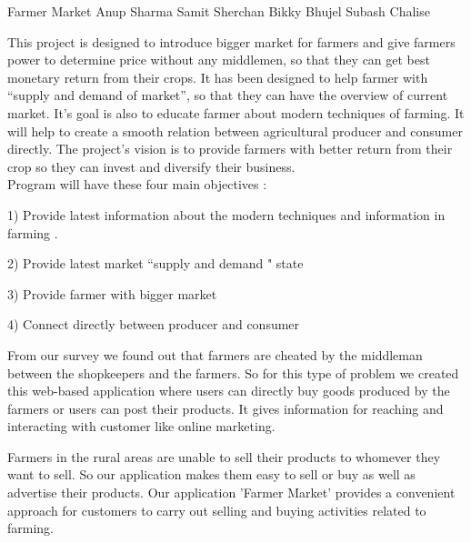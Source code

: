  \begin{conf-abstract}[]
 {Farmer Market }
 {Anup Sharma
 	Samit Sherchan
 	Bikky Bhujel
 	Subash Chalise
 }
{}

This project is designed to introduce bigger market for farmers and give farmers power to determine price without any middlemen, so that they can get best monetary return from their crops. It has been designed to help farmer with “supply and demand of market”, so that they can have the overview of current market. It’s goal is also to educate farmer about modern techniques of farming. It will help to create a smooth relation between agricultural producer and consumer directly. The project’s vision is to provide farmers with better return from their crop so they can invest and diversify their business.
\\
Program will have these four main objectives :

1) Provide latest information about the modern techniques and information in farming .

2) Provide latest market “supply and demand " state

3) Provide farmer with bigger market

4) Connect directly between producer and consumer

From our survey we found out that farmers are cheated by the middleman between the shopkeepers and the farmers. So for this type of problem we created this web-based application where users can directly buy goods produced by the farmers or users can post their products. It gives information for reaching and interacting with customer like online marketing. 

Farmers in the rural areas are unable to sell their products to whomever they want to sell. So our application makes them easy to sell or buy as well as advertise their products. Our application 'Farmer Market' provides a convenient approach for customers to carry out selling and buying activities related to farming.

 \end{conf-abstract}
